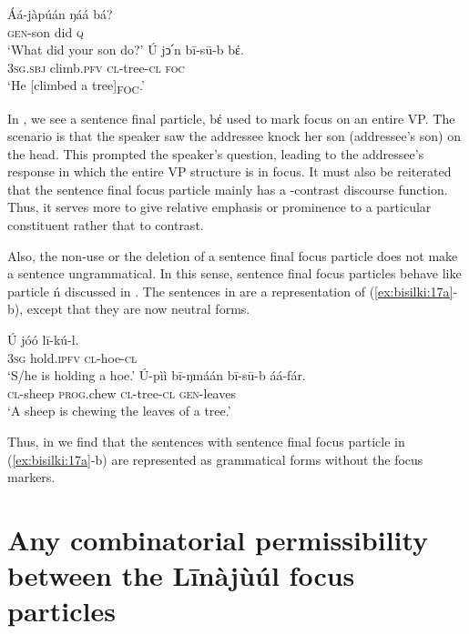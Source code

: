 \documentclass[output=paper,colorlinks,citecolor=brown]{langscibook}
\begin{document}
\ea%
    \label{ex:bisilki:19}
    \ea\label{ex:bisilki:19a}
    \gll    Áá-jàpúán	ŋáá	bá?\\
            \textsc{gen-}son	did	\textsc{q}\\
    \glt    ‘What did your son do?’
    \ex\label{ex:bisilki:19b}
    \gll    Ú		jↄ՛n		bī-sū-b	bέ.\\
            \textsc{3sg.sbj}	climb\textsc{.pfv}	\textsc{cl-}tree\textsc{-cl}	\textsc{foc}\\
    \glt    ‘He [climbed a tree]\textsubscript{FOC}.’
    \z
\z

In , we see a sentence final particle, bέ used to mark focus on an entire VP. The scenario is that the speaker  saw the addressee  knock her son (addressee’s son) on the head. This prompted the speaker’s question, leading to the addressee’s response  in which the entire VP structure is in focus. It must also be reiterated that the sentence final focus particle mainly has a -contrast discourse function. Thus, it serves more to give relative emphasis or prominence to a particular constituent rather that to contrast.

Also, the non-use or the deletion of a sentence final focus particle does not make a sentence ungrammatical. In this sense, sentence final focus particles behave like particle ń discussed in . The sentences in  are a representation of (\ref{ex:bisilki:17a}-b), except that they are now neutral forms.

\ea%
    \label{ex:bisilki:20}
    \ea\label{ex:bisilki:20a}
    \gll    Ú	jóó		lī-kú-l.\\
            \textsc{3sg}	hold\textsc{.ipfv}	\textsc{cl-}hoe\textsc{-cl}\\
    \glt    ‘S/he is holding a hoe.’
    \ex\label{ex:bisilki:20b}
    \gll    Ú-pìì		bī-ŋmáán	bī-sū-b	áá-fár.\\
            \textsc{cl-}sheep	\textsc{prog.}chew	\textsc{cl-}tree\textsc{-cl}	\textsc{gen-}leaves\\
    \glt    ‘A sheep is chewing the leaves of a tree.’
    \z
\z

Thus, in  we find that the sentences with sentence final focus particle in (\ref{ex:bisilki:17a}-b) are represented as grammatical forms without the focus markers.

\section{Any combinatorial permissibility between the Līnàjùúl focus particles}\label{sec:bisilki:6}
\end{document}
